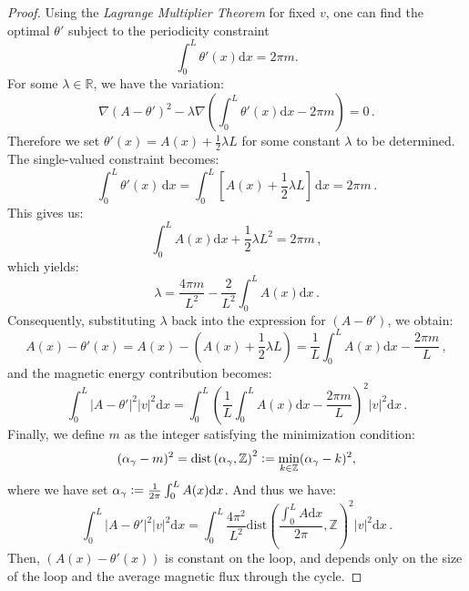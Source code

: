\documentclass[12pt,a4paper]{amsart}
\theoremstyle{definition}
\theoremstyle{plain}
\newcommand{\defeq}{\vcentcolon=}
\numberwithin{equation}{section}
\begin{document}
\begin{proof}
Using the \emph{Lagrange Multiplier Theorem} for fixed $v$, one can find the optimal $\theta'$ subject to the periodicity constraint 
\begin{equation}
    \int_0^L \theta'(x) \mathrm{d}x = 2 \pi m.
\end{equation}
For some $\lambda \in \mathbb{R}$, we have the variation:
\begin{equation}
\nabla (A-\theta')^2 - \lambda \nabla\left(\int_0^L \theta'(x) \mathrm{d}x - 2\pi m\right ) = 0\,.
\end{equation}
Therefore we set $\theta'(x) = A(x) + \frac{1}{2}\lambda L$ for some constant $\lambda$ to be determined. The single-valued constraint becomes:
\begin{equation}
\int_0^L \theta'(x)\, \mathrm{d}x = \int_0^L \left[A(x) + \frac{1}{2}\lambda L\right ]\, \mathrm{d}x = 2\pi m\,.
\end{equation}
This gives us:
\begin{equation}
\int_0^L A(x) \mathrm{d}x + \frac{1}{2}\lambda L^2 = 2\pi m\,,
\end{equation}
which yields:
\begin{equation}
\lambda = \frac{4\pi m}{L^2} - \frac{2}{L^2}\int_0^L A(x) \mathrm{d}x \,.
\end{equation}
Consequently, substituting $\lambda$ back into the expression for $(A-\theta')$, we obtain:
\begin{equation}
     A(x) - \theta'(x) = A(x) - \left(A(x) + \frac{1}{2}\lambda L\right) = \frac{1}{L}\int_0^L A(x) \mathrm{d}x - \frac{2\pi m}{L}\,,
\end{equation} 
and the magnetic energy contribution becomes:
\begin{equation}
\int_0^L |A - \theta'|^2|v|^2 \mathrm{d}x =  \int_0^L  \left(\frac{1}{L}\int_0^L A(x) \mathrm{d}x - \frac{2\pi m}{L}\right)^2|v|^2 \mathrm{d}x\,.
\end{equation}
Finally, we define $m$ as the integer satisfying the minimization condition:
$$
(\alpha_\gamma - m)^2 = \mathrm{dist}\left(\alpha_\gamma, \mathbb{Z}\right)^2 \defeq \min_{k \in \mathbb{Z}} (\alpha_\gamma - k)^2,
$$
where we have set $\alpha_\gamma \defeq \frac{1}{2\pi} \int_{0}^L A(x) \mathrm{d} x$.
And thus we have:
\begin{equation}
    \int_0^L \left|A - \theta'\right|^2|v|^2 \mathrm{d}x = \int_0^L \frac{4 \pi^2}{L^2} \mathrm{dist}\left( \frac{\int_0^L A \mathrm{d}x}{2 \pi}, \mathbb{Z} \right)^2 |v|^2 \mathrm{d}x\, .
\end{equation}
Then, $\left(A(x) - \theta'(x)\right)$ is constant on the loop, and depends only on the size of the loop and the average magnetic flux through the cycle. 


\end{proof}
\end{document}
